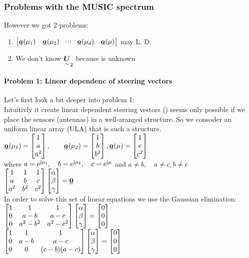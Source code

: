 \subsubsection{Problems with the MUSIC spectrum}
However we got 2 problems:
\begin{enumerate}
	\item $\begin{bmatrix} \underline{\boldsymbol {a}}(\mu_1)& \underline{\boldsymbol {a}}(\mu_2) & \!\cdot \!\cdot\!\cdot\! & \underline{\boldsymbol {a}}(\mu_d) & \underline{\boldsymbol {a}}(\mu) \end{bmatrix}$ may L. D.
	\item We don't know $\underset{\sim}{\boldsymbol {U}}_2$ because  is unknown 
\end{enumerate}

\paragraph{Problem 1: Linear dependenc of steering vectors}
Let's first look a bit deeper into problem 1:\\
Intuitivly it create linear dependent steering vestors () seems only possible if we place the sensors (antennas) in a well-aranged structure. So we consoder an uniform linear array (ULA) that is such a structure.\\
$\underline{\boldsymbol {a}}(\mu_1)=\begin{bmatrix} 1\\a\\a^2 \end{bmatrix},\qquad\underline{\boldsymbol {a}}(\mu_2)=\begin{bmatrix} 1\\b\\b^2 \end{bmatrix},\underline{\boldsymbol {a}}(\mu)=\begin{bmatrix} 1\\c\\c^2 \end{bmatrix}$\\
where $a=e^{\mathrm{j}\mu_1},\quad b=e^{\mathrm{j}\mu_2},\quad c=e^{\mathrm{j}\mu}$ and $a\neq b,\quad a\neq c, b\neq c$\\
$\begin{bmatrix} 1&1&1\\a&b&c\\a^2&b^2&c^2 \end{bmatrix}\begin{bmatrix} \alpha\\\beta\\\gamma \end{bmatrix}=\underline{\boldsymbol {0}}$\\
In order to solve this set of linear equations we use the Gaussian elimination:\\
$\begin{bmatrix} 1&1&1\\0&a-b&a-c\\0&a^2-b^2&a^2-c^2 \end{bmatrix}\begin{bmatrix} \alpha\\\beta\\\gamma \end{bmatrix}=\begin{bmatrix} 0\\0\\0 \end{bmatrix}$\\
$\begin{bmatrix} 1&1&1\\0&a-b&a-c\\0&0&(c-b)(a-c) \end{bmatrix}\begin{bmatrix} \alpha\\\beta\\\gamma \end{bmatrix}=\begin{bmatrix} 0\\0\\0 \end{bmatrix}$\\
